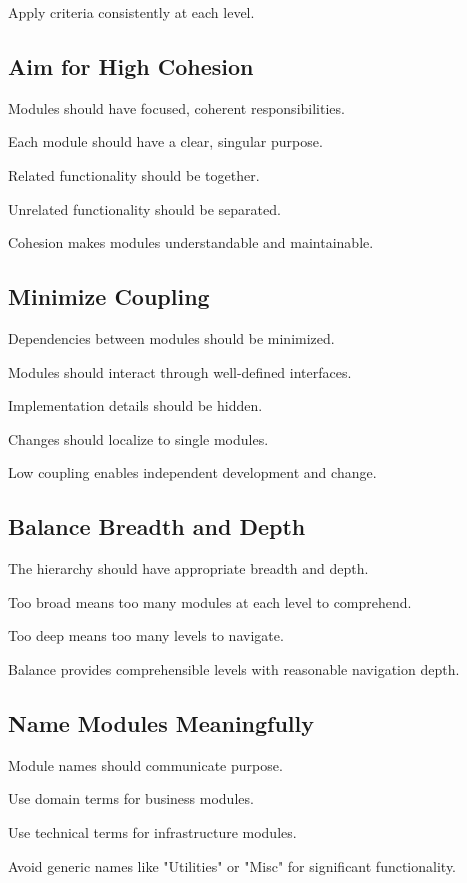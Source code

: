 \documentclass[11pt]{article}
\begin{document}
Apply criteria consistently at each level.

\subsection{Aim for High Cohesion}

Modules should have focused, coherent responsibilities.

Each module should have a clear, singular purpose.

Related functionality should be together.

Unrelated functionality should be separated.

Cohesion makes modules understandable and maintainable.

\subsection{Minimize Coupling}

Dependencies between modules should be minimized.

Modules should interact through well-defined interfaces.

Implementation details should be hidden.

Changes should localize to single modules.

Low coupling enables independent development and change.

\subsection{Balance Breadth and Depth}

The hierarchy should have appropriate breadth and depth.

Too broad means too many modules at each level to comprehend.

Too deep means too many levels to navigate.

Balance provides comprehensible levels with reasonable navigation depth.

\subsection{Name Modules Meaningfully}

Module names should communicate purpose.

Use domain terms for business modules.

Use technical terms for infrastructure modules.

Avoid generic names like "Utilities" or "Misc" for significant functionality.
\end{document}
